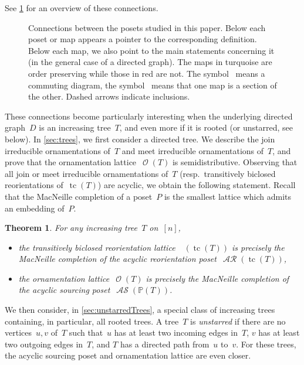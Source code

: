 \documentclass{amsart}
\newtheorem{theorem}{Theorem}[section]
\theoremstyle{definition}
\renewcommand{\c}[1]{\mathcal{#1}} %
\DeclareMathOperator{\tc}{tc} %
\newcommand{\darkblue}{\color{darkblue}} %
\newcommand{\defn}[1]{\textsl{\darkblue #1}} %
\DeclareMathOperator{\Orn}{\c{O}}  %
\DeclareMathOperator{\AReori}{\c{AR}}  %
\DeclareMathOperator{\Rbi}{\c{R}^{bi}}  %
\DeclareMathOperator{\ASour}{\mathcal{AS}}  %
\newcommand{\PP}{\mathbb P} %
\begin{document}
See \cref{fig:allMaps} for an overview of these connections.

\begin{figure}
	\centerline{}
	\caption{Connections between the posets studied in this paper. Below each poset or map appears a pointer to the corresponding definition. Below each map, we also point to the main statements concerning it (in the general case of a directed graph). The maps in turquoise are order preserving while those in red are not. The symbol~\smash{\Large$\circlearrowleft$} means a commuting diagram, the symbol~ means that one map is a section of the other. Dashed arrows indicate inclusions.}
	\label{fig:allMaps}
\end{figure}

\medskip
These connections become particularly interesting when the underlying directed graph~$D$ is an increasing tree~$T$, and even more if it is rooted (or unstarred, see below).
In \cref{sec:trees}, we first consider a directed tree.
We describe the join irreducible ornamentations of~$T$ and meet irreducible ornamentations of~$T$, and prove that the ornamentation lattice~$\Orn(T)$ is semidistributive.
Observing that all join or meet irreducible ornamentations of~$T$ (resp.~transitively biclosed reorientations of~$\tc(T)$) are acyclic, we obtain the following statement.
Recall that the MacNeille completion of a poset~$P$ is the smallest lattice which admits an embedding of~$P$.

\begin{theorem}
\label{thm:main1}
For any increasing tree~$T$ on~$[n]$, 
\begin{itemize}
\item the transitively biclosed reorientation lattice~$\Rbi(\tc(T))$ is precisely the MacNeille completion of the acyclic reorientation poset~$\AReori(\tc(T))$,
\item the ornamentation lattice~$\Orn(T)$ is precisely the MacNeille completion of the acyclic sourcing poset~$\ASour(\PP(T))$.
\end{itemize}
\end{theorem}

We then consider, in \cref{sec:unstarredTrees}, a special class of increasing trees containing, in particular, all rooted trees.
A tree~$T$ is \defn{unstarred} if there are no vertices~$u,v$ of~$T$ such that~$u$ has at least two incoming edges in~$T$, $v$ has at least two outgoing edges in~$T$, and $T$ has a directed path from~$u$ to~$v$.
For these trees, the acyclic sourcing poset and ornamentation lattice are even closer.
\end{document}
